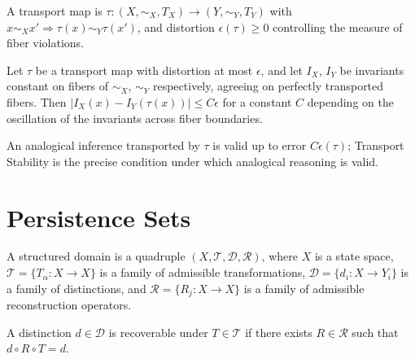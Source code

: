 \begin{definition}[Transport]
\label{def:dg-transport}
A transport map is $\tau: (X,\sim_X,T_X) \to (Y,\sim_Y,T_Y)$ with $x \sim_X
x' \Rightarrow \tau(x) \sim_Y \tau(x')$, and distortion $\epsilon(\tau) \ge 0$
controlling the measure of fiber violations.
\end{definition}

\begin{theorem}
\label{thm:transport-stability}
Let $\tau$ be a transport map with distortion at most $\epsilon$, and let
$I_X$, $I_Y$ be invariants constant on fibers of $\sim_X$, $\sim_Y$
respectively, agreeing on perfectly transported fibers. Then $|I_X(x) -
I_Y(\tau(x))| \le C\epsilon$ for a constant $C$ depending on the oscillation
of the invariants across fiber boundaries.
\end{theorem}

\begin{corollary}
\label{cor:justification-of-analogy}
An analogical inference transported by $\tau$ is valid up to error
$C\epsilon(\tau)$; Transport Stability is the precise condition under which
analogical reasoning is valid.
\end{corollary}

\section{Persistence Sets}
\label{sec:persistence-sets}


\begin{definition}
\label{def:structured-domain}
A structured domain is a quadruple $(X, \mathcal{T}, \mathcal{D}, \mathcal{R})$,
where $X$ is a state space, $\mathcal{T} = \{T_\alpha : X \to X\}$ is a
family of admissible transformations, $\mathcal{D} = \{d_i : X \to Y_i\}$ is
a family of distinctions, and $\mathcal{R} = \{R_j : X \to X\}$ is a family
of admissible reconstruction operators.
\end{definition}

\begin{definition}
\label{def:recoverability-relation}
A distinction $d \in \mathcal{D}$ is recoverable under $T \in \mathcal{T}$ if
there exists $R \in \mathcal{R}$ such that $d \circ R \circ T = d$.
\end{definition}

